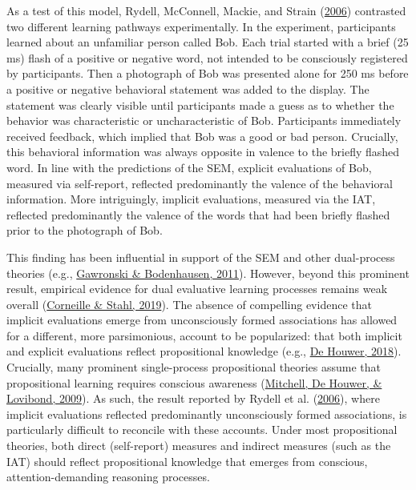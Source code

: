\documentclass[
  man,floatsintext]{apa6}
\begin{document}
As a test of this model, Rydell, McConnell, Mackie, and Strain (\protect\hyperlink{ref-rydell_two_2006}{2006}) contrasted two different learning pathways experimentally.
In the experiment, participants learned about an unfamiliar person called Bob.
Each trial started with a brief (25 ms) flash of a positive or negative word, not intended to be consciously registered by participants.
Then a photograph of Bob was presented alone for 250 ms before a positive or negative behavioral statement was added to the display.
The statement was clearly visible until participants made a guess as to whether the behavior was characteristic or uncharacteristic of Bob.
Participants immediately received feedback, which implied that Bob was a good or bad person.
Crucially, this behavioral information was always opposite in valence to the briefly flashed word.
In line with the predictions of the SEM, explicit evaluations of Bob, measured via self-report, reflected predominantly the valence of the behavioral information.
More intriguingly, implicit evaluations, measured via the IAT, reflected predominantly the valence of the words that had been briefly flashed prior to the photograph of Bob.

This finding has been influential in support of the SEM and other dual-process theories (e.g., \protect\hyperlink{ref-gawronskiAssociativePropositionalEvaluation2011}{Gawronski \& Bodenhausen, 2011}).
However, beyond this prominent result, empirical evidence for dual evaluative learning processes remains weak overall (\protect\hyperlink{ref-corneilleAssociativeAttitudeLearning2018a}{Corneille \& Stahl, 2019}).
The absence of compelling evidence that implicit evaluations emerge from unconsciously formed associations has allowed for a different, more parsimonious, account to be popularized: that both implicit and explicit evaluations reflect propositional knowledge (e.g., \protect\hyperlink{ref-de_houwer_propositional_2018}{De Houwer, 2018}).
Crucially, many prominent single-process propositional theories assume that propositional learning requires conscious awareness (\protect\hyperlink{ref-mitchellPropositionalNatureHuman2009}{Mitchell, De Houwer, \& Lovibond, 2009}).
As such, the result reported by Rydell et al. (\protect\hyperlink{ref-rydell_two_2006}{2006}), where implicit evaluations reflected predominantly unconsciously formed associations, is particularly difficult to reconcile with these accounts.
Under most propositional theories, both direct (self-report) measures and indirect measures (such as the IAT) should reflect propositional knowledge that emerges from conscious, attention-demanding reasoning processes.
\end{document}
